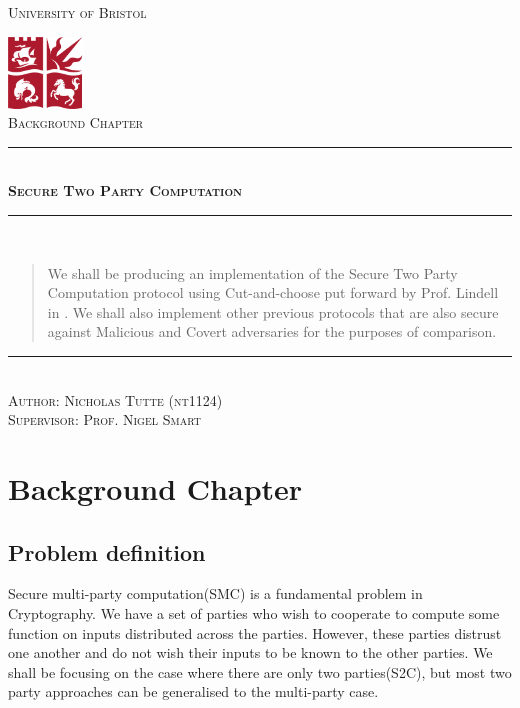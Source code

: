 \documentclass[a4paper,10pt]{article}
\newcommand{\HRule}{\rule{\linewidth}{0.5mm}}
\begin{document}
	\begin{titlepage}
		\begin{center}

			\textsc{\LARGE University of Bristol}
			\vspace{2cm}
    
			\includegraphics[width=0.15\textwidth]{./bristolunilogo}~\\[1cm]
    
			\textsc{\Large Background Chapter}
    
			\vspace{3cm}
			\HRule \\[0.4cm]
			\textsc{ \huge \bfseries Secure Two Party Computation}
			\HRule \\[0.4cm]
			\vspace{2cm}
    
			\begin{abstract}
				We shall be producing an implementation of the Secure Two Party Computation protocol using Cut-and-choose put forward by Prof. Lindell in \cite{Lindell_CnC_2014}. We shall also implement other previous protocols that are also secure against Malicious and Covert adversaries for the purposes of comparison.
			\end{abstract}
    
			\vspace{3cm}
			\noindent\rule{12cm}{0.2pt}\\[0.2cm]
			\textsc{\Large Author: Nicholas Tutte (nt1124)}\\[0.2cm]
			\textsc{\Large Supervisor: Prof. Nigel Smart}
    
		\end{center}
	\end{titlepage}

	\section{Background Chapter}
		\subsection{Problem definition} \label{InformalProbDef}
			Secure multi-party computation(SMC) is a fundamental problem in Cryptography. We have a set of parties who wish to cooperate to compute some function on inputs distributed across the parties. However, these parties distrust one another and do not wish their inputs to be known to the other parties. We shall be focusing on the case where there are only two parties(S2C), but most two party approaches can be generalised to the multi-party case.\\
\end{document}
